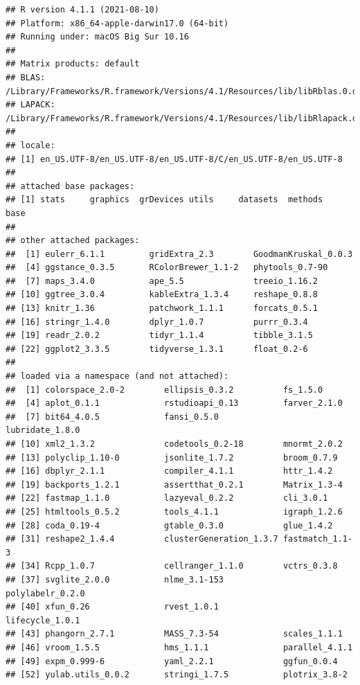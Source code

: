 \documentclass[
  11pt,
]{article}
\begin{document}
\begin{verbatim}
## R version 4.1.1 (2021-08-10)
## Platform: x86_64-apple-darwin17.0 (64-bit)
## Running under: macOS Big Sur 10.16
## 
## Matrix products: default
## BLAS:   /Library/Frameworks/R.framework/Versions/4.1/Resources/lib/libRblas.0.dylib
## LAPACK: /Library/Frameworks/R.framework/Versions/4.1/Resources/lib/libRlapack.dylib
## 
## locale:
## [1] en_US.UTF-8/en_US.UTF-8/en_US.UTF-8/C/en_US.UTF-8/en_US.UTF-8
## 
## attached base packages:
## [1] stats     graphics  grDevices utils     datasets  methods   base     
## 
## other attached packages:
##  [1] eulerr_6.1.1         gridExtra_2.3        GoodmanKruskal_0.0.3
##  [4] ggstance_0.3.5       RColorBrewer_1.1-2   phytools_0.7-90     
##  [7] maps_3.4.0           ape_5.5              treeio_1.16.2       
## [10] ggtree_3.0.4         kableExtra_1.3.4     reshape_0.8.8       
## [13] knitr_1.36           patchwork_1.1.1      forcats_0.5.1       
## [16] stringr_1.4.0        dplyr_1.0.7          purrr_0.3.4         
## [19] readr_2.0.2          tidyr_1.1.4          tibble_3.1.5        
## [22] ggplot2_3.3.5        tidyverse_1.3.1      float_0.2-6         
## 
## loaded via a namespace (and not attached):
##  [1] colorspace_2.0-2        ellipsis_0.3.2          fs_1.5.0               
##  [4] aplot_0.1.1             rstudioapi_0.13         farver_2.1.0           
##  [7] bit64_4.0.5             fansi_0.5.0             lubridate_1.8.0        
## [10] xml2_1.3.2              codetools_0.2-18        mnormt_2.0.2           
## [13] polyclip_1.10-0         jsonlite_1.7.2          broom_0.7.9            
## [16] dbplyr_2.1.1            compiler_4.1.1          httr_1.4.2             
## [19] backports_1.2.1         assertthat_0.2.1        Matrix_1.3-4           
## [22] fastmap_1.1.0           lazyeval_0.2.2          cli_3.0.1              
## [25] htmltools_0.5.2         tools_4.1.1             igraph_1.2.6           
## [28] coda_0.19-4             gtable_0.3.0            glue_1.4.2             
## [31] reshape2_1.4.4          clusterGeneration_1.3.7 fastmatch_1.1-3        
## [34] Rcpp_1.0.7              cellranger_1.1.0        vctrs_0.3.8            
## [37] svglite_2.0.0           nlme_3.1-153            polylabelr_0.2.0       
## [40] xfun_0.26               rvest_1.0.1             lifecycle_1.0.1        
## [43] phangorn_2.7.1          MASS_7.3-54             scales_1.1.1           
## [46] vroom_1.5.5             hms_1.1.1               parallel_4.1.1         
## [49] expm_0.999-6            yaml_2.2.1              ggfun_0.0.4            
## [52] yulab.utils_0.0.2       stringi_1.7.5           plotrix_3.8-2          

\end{verbatim}
\end{document}
